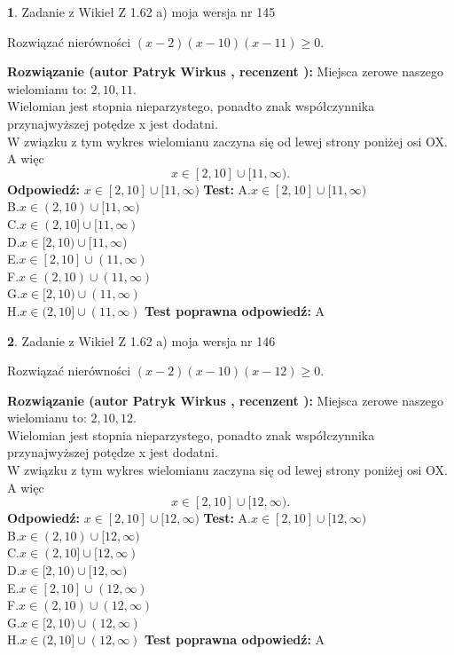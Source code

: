\documentclass[12pt, a4paper]{article}
\theoremstyle{definition} %
\newtheorem{zad}{}
\newcommand{\zadStart}[1]{\begin{zad}#1\newline}
\newcommand{\zadStop}{\end{zad}}
\newcommand{\rozwStart}[2]{\noindent \textbf{Rozwiązanie (autor #1 , recenzent #2): }\newline}
\newcommand{\rozwStop}{\newline}
\newcommand{\odpStart}{\noindent \textbf{Odpowiedź:}\newline}
\newcommand{\odpStop}{\newline}
\newcommand{\testStart}{\noindent \textbf{Test:}\newline}
\newcommand{\testStop}{\newline}
\newcommand{\kluczStart}{\noindent \textbf{Test poprawna odpowiedź:}\newline}
\newcommand{\kluczStop}{\newline}
\begin{document}
\zadStart{Zadanie z Wikieł Z 1.62 a) moja wersja nr 145}

Rozwiązać nierówności $(x-2)(x-10)(x-11)\ge0$.
\zadStop
\rozwStart{Patryk Wirkus}{}
Miejsca zerowe naszego wielomianu to: $2, 10, 11$.\\
Wielomian jest stopnia nieparzystego, ponadto znak współczynnika przy\linebreak najwyższej potędze x jest dodatni.\\ W związku z tym wykres wielomianu zaczyna się od lewej strony poniżej osi OX. A więc $$x \in [2,10] \cup [11,\infty).$$
\rozwStop
\odpStart
$x \in [2,10] \cup [11,\infty)$
\odpStop
\testStart
A.$x \in [2,10] \cup [11,\infty)$\\
B.$x \in (2,10) \cup [11,\infty)$\\
C.$x \in (2,10] \cup [11,\infty)$\\
D.$x \in [2,10) \cup [11,\infty)$\\
E.$x \in [2,10] \cup (11,\infty)$\\
F.$x \in (2,10) \cup (11,\infty)$\\
G.$x \in [2,10) \cup (11,\infty)$\\
H.$x \in (2,10] \cup (11,\infty)$
\testStop
\kluczStart
A
\kluczStop



\zadStart{Zadanie z Wikieł Z 1.62 a) moja wersja nr 146}

Rozwiązać nierówności $(x-2)(x-10)(x-12)\ge0$.
\zadStop
\rozwStart{Patryk Wirkus}{}
Miejsca zerowe naszego wielomianu to: $2, 10, 12$.\\
Wielomian jest stopnia nieparzystego, ponadto znak współczynnika przy\linebreak najwyższej potędze x jest dodatni.\\ W związku z tym wykres wielomianu zaczyna się od lewej strony poniżej osi OX. A więc $$x \in [2,10] \cup [12,\infty).$$
\rozwStop
\odpStart
$x \in [2,10] \cup [12,\infty)$
\odpStop
\testStart
A.$x \in [2,10] \cup [12,\infty)$\\
B.$x \in (2,10) \cup [12,\infty)$\\
C.$x \in (2,10] \cup [12,\infty)$\\
D.$x \in [2,10) \cup [12,\infty)$\\
E.$x \in [2,10] \cup (12,\infty)$\\
F.$x \in (2,10) \cup (12,\infty)$\\
G.$x \in [2,10) \cup (12,\infty)$\\
H.$x \in (2,10] \cup (12,\infty)$
\testStop
\kluczStart
A
\kluczStop
\end{document}
